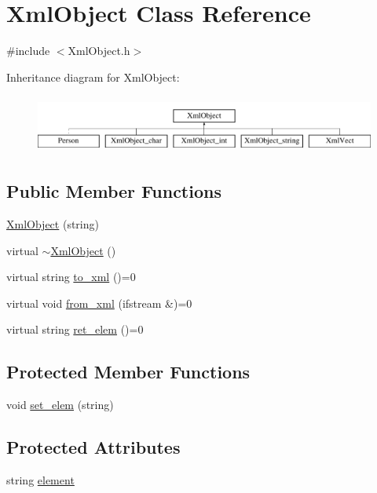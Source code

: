 \hypertarget{classXmlObject}{\section{Xml\-Object Class Reference}
\label{classXmlObject}
}


{\ttfamily \#include $<$Xml\-Object.\-h$>$}

Inheritance diagram for Xml\-Object\-:\begin{figure}[H]
\begin{center}
\leavevmode
\includegraphics[height=1.931034cm]{classXmlObject}
\end{center}
\end{figure}
\subsection*{Public Member Functions}
\begin{DoxyCompactItemize}
\item 
\hyperlink{classXmlObject_a98b14e9c386ae0aa45a3a99d922c642f}{Xml\-Object} (string)
\item 
virtual \hyperlink{classXmlObject_aa25f0aab0b3f4b9f94185285d6297f20}{$\sim$\-Xml\-Object} ()
\item 
virtual string \hyperlink{classXmlObject_a23b560b6ef62e13cbe227824df5365c3}{to\-\_\-xml} ()=0
\item 
virtual void \hyperlink{classXmlObject_a1f45234b87c92b116b5d036875d46d65}{from\-\_\-xml} (ifstream \&)=0
\item 
virtual string \hyperlink{classXmlObject_ae6aa20b1e0ef049e6cc8ddedc2cd8761}{ret\-\_\-elem} ()=0
\end{DoxyCompactItemize}
\subsection*{Protected Member Functions}
\begin{DoxyCompactItemize}
\item 
void \hyperlink{classXmlObject_a55616473c9f22c01fd3f3d5a31a2a72f}{set\-\_\-elem} (string)
\end{DoxyCompactItemize}
\subsection*{Protected Attributes}
\begin{DoxyCompactItemize}
\item 
string \hyperlink{classXmlObject_a61cc11441cc570e229cd4cf2e8b1736f}{element}
\end{DoxyCompactItemize}


